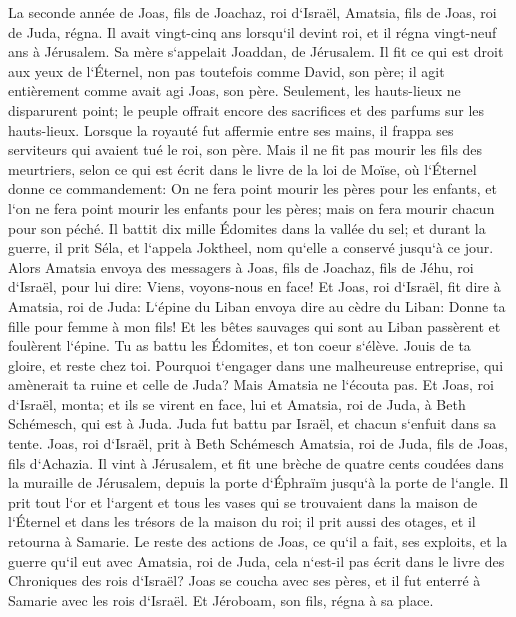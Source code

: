\verse La seconde année de Joas, fils de Joachaz, roi d`Israël, Amatsia, fils de Joas, roi de Juda, régna. 
\verse Il avait vingt-cinq ans lorsqu`il devint roi, et il régna vingt-neuf ans à Jérusalem. Sa mère s`appelait Joaddan, de Jérusalem. 
\verse Il fit ce qui est droit aux yeux de l`Éternel, non pas toutefois comme David, son père; il agit entièrement comme avait agi Joas, son père. 
\verse Seulement, les hauts-lieux ne disparurent point; le peuple offrait encore des sacrifices et des parfums sur les hauts-lieux. 
\verse Lorsque la royauté fut affermie entre ses mains, il frappa ses serviteurs qui avaient tué le roi, son père. 
\verse Mais il ne fit pas mourir les fils des meurtriers, selon ce qui est écrit dans le livre de la loi de Moïse, où l`Éternel donne ce commandement: On ne fera point mourir les pères pour les enfants, et l`on ne fera point mourir les enfants pour les pères; mais on fera mourir chacun pour son péché. 
\verse Il battit dix mille Édomites dans la vallée du sel; et durant la guerre, il prit Séla, et l`appela Joktheel, nom qu`elle a conservé jusqu`à ce jour. 
\verse Alors Amatsia envoya des messagers à Joas, fils de Joachaz, fils de Jéhu, roi d`Israël, pour lui dire: Viens, voyons-nous en face! 
\verse Et Joas, roi d`Israël, fit dire à Amatsia, roi de Juda: L`épine du Liban envoya dire au cèdre du Liban: Donne ta fille pour femme à mon fils! Et les bêtes sauvages qui sont au Liban passèrent et foulèrent l`épine. 
\verse Tu as battu les Édomites, et ton coeur s`élève. Jouis de ta gloire, et reste chez toi. Pourquoi t`engager dans une malheureuse entreprise, qui amènerait ta ruine et celle de Juda? 
\verse Mais Amatsia ne l`écouta pas. Et Joas, roi d`Israël, monta; et ils se virent en face, lui et Amatsia, roi de Juda, à Beth Schémesch, qui est à Juda. 
\verse Juda fut battu par Israël, et chacun s`enfuit dans sa tente. 
\verse Joas, roi d`Israël, prit à Beth Schémesch Amatsia, roi de Juda, fils de Joas, fils d`Achazia. Il vint à Jérusalem, et fit une brèche de quatre cents coudées dans la muraille de Jérusalem, depuis la porte d`Éphraïm jusqu`à la porte de l`angle. 
\verse Il prit tout l`or et l`argent et tous les vases qui se trouvaient dans la maison de l`Éternel et dans les trésors de la maison du roi; il prit aussi des otages, et il retourna à Samarie. 
\verse Le reste des actions de Joas, ce qu`il a fait, ses exploits, et la guerre qu`il eut avec Amatsia, roi de Juda, cela n`est-il pas écrit dans le livre des Chroniques des rois d`Israël? 
\verse Joas se coucha avec ses pères, et il fut enterré à Samarie avec les rois d`Israël. Et Jéroboam, son fils, régna à sa place. 
